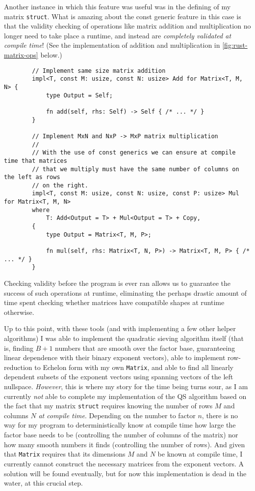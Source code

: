 \documentclass{report}
\newenvironment{code}{\captionsetup{type=listing}}{}
\begin{document}
Another instance in which this feature was useful was in the defining of my
matrix \Verb+struct+. What is amazing about the const generic feature in this
case is that the validity checking of operations like matrix addition and
multiplication no longer need to take place a runtime, and instead are
\emph{completely validated at compile time}! (See the implementation of addition
and multiplication in \cref{fig:rust-matrix-ops} below.)
\begin{code}
    \begin{verbatim}
        // Implement same size matrix addition
        impl<T, const M: usize, const N: usize> Add for Matrix<T, M, N> {
            type Output = Self;

            fn add(self, rhs: Self) -> Self { /* ... */ }
        }

        // Implement MxN and NxP -> MxP matrix multiplication
        //
        // With the use of const generics we can ensure at compile time that matrices
        // that we multiply must have the same number of columns on the left as rows
        // on the right.
        impl<T, const M: usize, const N: usize, const P: usize> Mul for Matrix<T, M, N>
        where
            T: Add<Output = T> + Mul<Output = T> + Copy,
        {
            type Output = Matrix<T, M, P>;

            fn mul(self, rhs: Matrix<T, N, P>) -> Matrix<T, M, P> { /* ... */ }
        }
    \end{verbatim}
    \caption{%
        Excerpt of my implementation of matrices in Rust,
        using traits and the const generic feature.
    }
    \label{fig:rust-matrix-ops}
\end{code}
\noindent
Checking validity before the program is ever ran allows us to guarantee the
success of such operations at runtime, eliminating the perhaps drastic amount of
time spent checking whether matrices have compatible shapes at runtime
otherwise.

Up to this point, with these tools (and with implementing a few other helper
algorithms) I was able to implement the quadratic sieving algorithm itself (that
is, finding $B+1$ numbers that are smooth over the factor base, guaranteeing
linear dependence with their binary exponent vectors), able to implement
row-reduction to Echelon form with my own \Verb+Matrix+, and able to find all
linearly dependent subsets of the exponent vectors using spanning vectors of the
left nullspace.
\emph{However}, this is where my story for the time being turns sour, as
I am currently \emph{not} able to complete my implementation of the QS algorithm
based on the fact that my matrix \Verb+struct+ requires knowing the number of rows $M$
and columns $N$ \emph{at compile time}. Depending on the number to factor $n$,
there is no way for my program to deterministically know at compile time how
large the factor base needs to be (controlling the number of columns of the
matrix) nor how many smooth numbers it finds (controlling the number of rows).
And given that \Verb+Matrix+ requires that its dimensions $M$ and $N$ be known
at compile time, I currently cannot construct the necessary matrices from the
exponent vectors. A solution will be found eventually, but for now this
implementation is dead in the water, at this crucial step.
\end{document}
